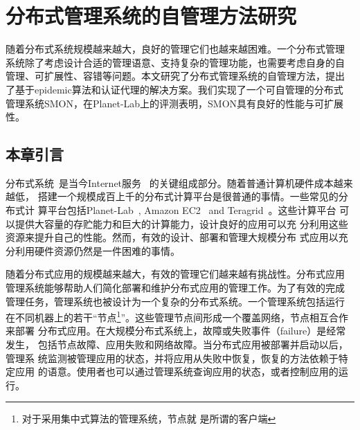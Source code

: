 \chapter{分布式管理系统的自管理方法研究}
\label{chap:selfman}

随着分布式系统规模越来越大，良好的管理它们也越来越困难。一个分布式管理
系统除了考虑设计合适的管理语意、支持复杂的管理功能，也需要考虑自身的自
管理、可扩展性、容错等问题。本文研究了分布式管理系统的自管理方法，提出
了基于epidemic算法和认证代理的解决方案。我们实现了一个可自管理的分布式
管理系统SMON，在Planet-Lab上的评测表明，SMON具有良好的性能与可扩展性。


%
%
%
%
%
%
%
%
%
%
%
%

\section{本章引言}

分布式系统~\cite{gfs, bigtable, dynamo}是当今Internet服务~
\cite{google, amazon}的关键组成部分。随着普通计算机硬件成本越来越低，
搭建一个规模成百上千的分布式计算平台是很普通的事情。一些常见的分布式计
算平台包括Planet-Lab~\cite{Bavier2004}, Amazon
EC2~\cite{Garfinkel2007} and Teragrid~\cite{Catlett2002}。这些计算平台
可以提供大容量的存贮能力和巨大的计算能力，设计良好的应用可以充
分利用这些资源来提升自己的性能。然而，有效的设计、部署和管理大规模分布
式应用以充分利用硬件资源仍然是一件困难的事情。

随着分布式应用的规模越来越大，有效的管理它们越来越有挑战性。分布式应用
管理系统能够帮助人们简化部署和维护分布式应用的管理工作。为了有效的完成
管理任务，管理系统也被设计为一个复杂的分布式系统。一个管理系统包括运行
在不同机器上的若干“节点\footnote{对于采用集中式算法的管理系统，节点就
是所谓的客户端}”。这些管理节点间形成一个覆盖网络，节点相互合作来部署
分布式应用。在大规模分布式系统上，故障或失败事件（failure）是经常发生，
包括节点故障、应用失败和网络故障。当分布式应用被部署并启动以后，管理系
统监测被管理应用的状态，并将应用从失败中恢复，恢复的方法依赖于特定应用
的语意。使用者也可以通过管理系统查询应用的状态，或者控制应用的运行。

